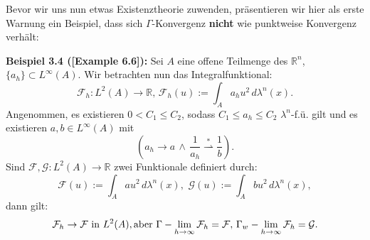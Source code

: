 Bevor wir uns nun etwas Existenztheorie zuwenden, präsentieren wir hier als erste Warnung ein Beispiel, dass sich \(\Gamma\)-Konvergenz \textbf{nicht} wie punktweise Konvergenz verhält:\\[0.5cm]
\colorbox{generalYellow}{\begin{minipage}{16cm}{\textcolor{black}{}{\label{ex3.4}}}
\textbf{Beispiel 3.4 (\cite{MasoGamma}[Example 6.6]):} Sei \(A\) eine offene Teilmenge des \(\mathbb{R}^n\), \(\{a_h\} \subset L^{\infty}(A)\). Wir betrachten nun das Integralfunktional:
\begin{equation}
    \mathcal{F}_h : L^2(A) \to \mathbb{R}, \, \mathcal{F}_h(u) := \int_A a_h u^2  \, d\lambda^n(x).
\end{equation}
Angenommen, es existieren \(0 < C_1 \leq C_2\), sodass \(C_1 \leq a_h \leq C_2\) \(\lambda^n\)-f.ü. gilt und es existieren \(a,b \in L^{\infty}(A)\) mit
\begin{equation}
    (a_h \to a \, \land \, \frac{1}{a_h} \stackrel{*}{\rightharpoonup} \frac{1}{b}).
\end{equation}
Sind \(\mathcal{F},\mathcal{G} : L^2(A) \to \mathbb{R}\) zwei Funktionale definiert durch:
\begin{equation}
    \mathcal{F}(u) := \int_A a u^2 \, d\lambda^n(x), \, \, \mathcal{G}(u) := \int_A b u^2 \, d\lambda^n(x),
\end{equation}
dann gilt:
\begin{equation}
    \mathcal{F}_h \to \mathcal{F} \text{ in }L^2(A), \text{aber } \Gamma - \lim_{h \to \infty} \mathcal{F}_h = \mathcal{F}, \, \Gamma_w - \lim_{h \to \infty} \mathcal{F}_h = \mathcal{G}. 
\end{equation}
\end{minipage}}\\

